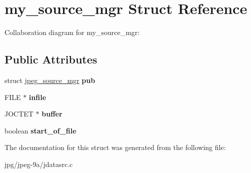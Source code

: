 \hypertarget{structmy__source__mgr}{\section{my\+\_\+source\+\_\+mgr Struct Reference}
\label{structmy__source__mgr}
}


Collaboration diagram for my\+\_\+source\+\_\+mgr\+:
\subsection*{Public Attributes}
\begin{DoxyCompactItemize}
\item 
\hypertarget{structmy__source__mgr_a8572f33f87bec948592001edea12680f}{struct \hyperlink{structjpeg__source__mgr}{jpeg\+\_\+source\+\_\+mgr} {\bfseries pub}}\label{structmy__source__mgr_a8572f33f87bec948592001edea12680f}

\item 
\hypertarget{structmy__source__mgr_a157a49dcdfd5723e566b1b8a35394a04}{F\+I\+L\+E $\ast$ {\bfseries infile}}\label{structmy__source__mgr_a157a49dcdfd5723e566b1b8a35394a04}

\item 
\hypertarget{structmy__source__mgr_ab92bf51a7ca44e0d3909aeb21fb0b0f8}{J\+O\+C\+T\+E\+T $\ast$ {\bfseries buffer}}\label{structmy__source__mgr_ab92bf51a7ca44e0d3909aeb21fb0b0f8}

\item 
\hypertarget{structmy__source__mgr_a5c505c9008db53bb3ce07ed8ae3872a9}{boolean {\bfseries start\+\_\+of\+\_\+file}}\label{structmy__source__mgr_a5c505c9008db53bb3ce07ed8ae3872a9}

\end{DoxyCompactItemize}


The documentation for this struct was generated from the following file\+:\begin{DoxyCompactItemize}
\item 
jpg/jpeg-\/9a/jdatasrc.\+c\end{DoxyCompactItemize}
